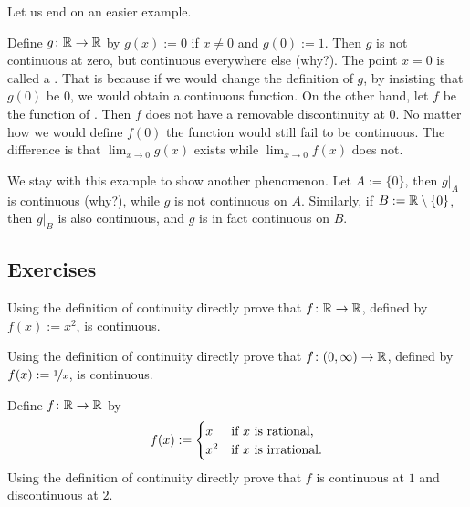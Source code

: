 Let us end on an easier example.

\begin{example} \label{example:removablediscont}
Define
$g \colon {\mathbb{R}} \to {\mathbb{R}}$ by $g(x) := 0$ if $x \not= 0$ and
$g(0) := 1$.  Then $g$ is not continuous at zero, but continuous everywhere else (why?).
The point $x=0$ is called a \emph{}.  That
is because if we would change the definition of $g$, by insisting that
$g(0)$ be $0$, we would obtain a continuous function.  On the other hand,
let $f$ be the function of .
Then $f$ does not have a
removable discontinuity at $0$.  No matter how we would define $f(0)$ the function
would still fail to be continuous.  The difference is that 
$\lim_{x\to 0} g(x)$ exists while
$\lim_{x\to 0} f(x)$ does not.

We stay with this example to show another phenomenon.
Let $A := \{ 0 \}$, then $g|_A$ is continuous (why?), while $g$ is not continuous on $A$.
Similarly, if $B := {\mathbb{R}} \setminus \{0 \}$, then $g|_B$ is also continuous,
and $g$ is in fact continuous on $B$.
\end{example}

\subsection{Exercises}

\begin{exercise}
Using the definition of continuity directly prove that
$f \colon {\mathbb{R}} \to {\mathbb{R}}$, defined by
$f(x) := x^2$, is continuous.
\end{exercise}

\begin{exercise}
Using the definition of continuity directly prove that
$f \colon (0,\infty) \to {\mathbb{R}}$, defined by
$f(x) := \nicefrac{1}{x}$, is continuous.
\end{exercise}

\begin{exercise}
Define $f \colon {\mathbb{R}} \to {\mathbb{R}}$ by
\begin{equation*}
f(x) :=
\begin{cases}
x & \text{if } x \text{ is rational,} \\
x^2 & \text{if } x \text{ is irrational.}
\end{cases}
\avoidbreak
\end{equation*}
Using the definition of continuity directly prove that
$f$ is continuous at $1$ and discontinuous at $2$.
\end{exercise}

